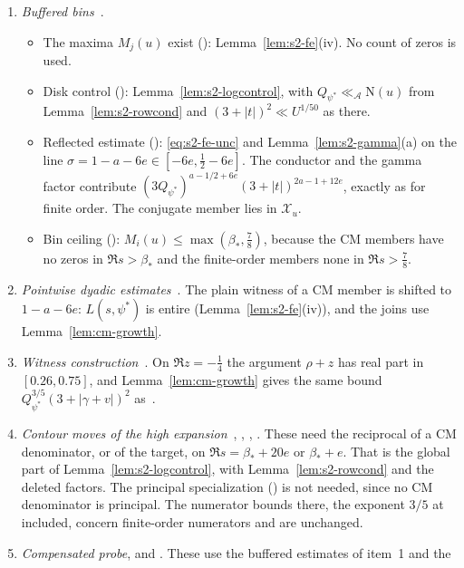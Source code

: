 \documentclass[11pt]{article}
\numberwithin{equation}{section}
\newcommand{\N}{\mathrm N}
\begin{document}
\begin{enumerate}
\item \emph{Buffered bins}~\cite[Lemma~8.1]{OAI78}.
 \begin{itemize}
 \item The maxima $M_j(u)$ exist (\cite[proof of Lemma~8.1]{OAI78}): Lemma~\ref{lem:s2-fe}(iv). No count of zeros is used.
 \item Disk control (\cite[proof of Lemma~8.1]{OAI78}): Lemma~\ref{lem:s2-logcontrol}, with $Q_{\psi^*}\ll_{\mathcal A}\N(u)$ from
  Lemma~\ref{lem:s2-rowcond} and $(3+|t|)^2\ll U^{1/50}$ as there.
 \item Reflected estimate (\cite[proof of Lemma~8.1]{OAI78}): \eqref{eq:s2-fe-unc} and Lemma~\ref{lem:s2-gamma}(a) on the line
  $\sigma=1-a-6e\in[-6e,\frac12-6e]$. The conductor and the gamma factor contribute
  $(3Q_{\psi^*})^{a-1/2+6e}(3+|t|)^{2a-1+12e}$, exactly as for finite order. The conjugate member lies in
  $\mathcal X_u$.
 \item Bin ceiling (\cite[Section~8.1]{OAI78}): $M_i(u)\le\max(\beta_*,\frac78)$, because the CM members have no zeros
  in $\Re s>\beta_*$ and the finite-order members none in $\Re s>\frac78$.
 \end{itemize}
\item \emph{Pointwise dyadic estimates}~\cite[Lemma~8.2 and its proof]{OAI78}. The plain witness of a
 CM member is shifted to $1-a-6e$: $L(s,\psi^*)$ is entire (Lemma~\ref{lem:s2-fe}(iv)), and the joins use
 Lemma~\ref{lem:cm-growth}.
\item \emph{Witness construction}~\cite[Prop.~8.3 and its proof]{OAI78}. On $\Re z=-\frac14$ the
 argument $\rho+z$ has real part in $[0.26,0.75]$, and Lemma~\ref{lem:cm-growth} gives the same bound
 $Q_{\psi^*}^{3/5}(3+|\gamma+v|)^2$ as~\cite[eq.~(4.14)]{OAI78}.
\item \emph{Contour moves of the high expansion}~\cite[Lemmas 10.3,
 10.5 and 10.6]{OAI78}, \cite[proof of Lemma~10.3]{OAI78}, \cite[proof of Lemma~10.5]{OAI78}, \cite[proof of Lemma~10.6]{OAI78}. These
 need the reciprocal of a CM denominator, or of the target, on $\Re s=\beta_*+20e$ or $\beta_*+e$. That is the
 global part of Lemma~\ref{lem:s2-logcontrol}, with Lemma~\ref{lem:s2-rowcond} and the deleted factors. The
 principal specialization (\cite[proof of Lemma~10.6]{OAI78}) is not needed, since no CM denominator is principal. The numerator
 bounds there, the exponent $3/5$ at \cite[proof of Lemma~10.6]{OAI78} included, concern finite-order numerators and are unchanged.
\item \emph{Compensated probe}, \cite[Section~16.2]{OAI78} and \cite[proof of Proposition~16.1]{OAI78}. These use the buffered estimates of item~1 and the

\end{enumerate}
\end{document}
